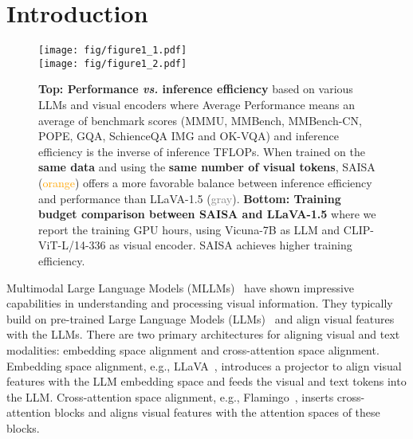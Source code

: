 \section{Introduction}
\label{sec:intro}

\begin{figure}[t!]
\centering
\texttt{[image: fig/figure1\_1.pdf]} \\
\hfill
\texttt{[image: fig/figure1\_2.pdf]}
\vspace{-0.1cm}
\caption{
\textbf{Top: Performance \textit{vs.} inference efficiency} based on various LLMs and visual encoders where Average Performance means an average of benchmark scores (MMMU, MMBench, MMBench-CN, POPE, GQA, SchienceQA IMG and OK-VQA) and inference efficiency is the inverse of inference TFLOPs.
When trained on the \textbf{same data} and using the \textbf{same number of visual tokens}, SAISA (\textcolor{orange}{orange}) offers a more favorable balance between inference efficiency and performance than LLaVA-1.5 (\textcolor{gray}{gray}).
\textbf{Bottom: Training budget comparison between SAISA and LLaVA-1.5} where we report the training GPU hours, using Vicuna-7B as LLM and CLIP-ViT-L/14-336 as visual encoder.
SAISA achieves higher training efficiency.
}
\label{fig:fig1}
\end{figure}

Multimodal Large Language Models (MLLMs)~\cite{gpt4v, liu2024improvedbaselinesvisualinstruction, Qwen-VL, chen2023minigptv2largelanguagemodel, dai2023instructblipgeneralpurposevisionlanguagemodels} have shown impressive capabilities in understanding and processing visual information.
They typically build on pre-trained Large Language Models (LLMs)~\cite{openai2024gpt4technicalreport, vicuna, bai2023qwentechnicalreport,  touvron2023llama2openfoundation} and align visual features with the LLMs.
There are two primary architectures for aligning visual and text modalities: embedding space alignment and cross-attention space alignment.
Embedding space alignment, e.g., LLaVA~\cite{liu2023visualinstructiontuning, liu2024improvedbaselinesvisualinstruction}, introduces a projector to align visual features with the LLM embedding space and feeds the visual and text tokens into the LLM.
Cross-attention space alignment, e.g., Flamingo~\cite{alayrac2022flamingovisuallanguagemodel}, inserts cross-attention blocks and aligns visual features with the attention spaces of these blocks.


